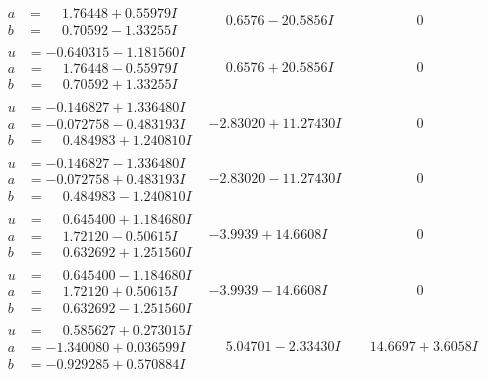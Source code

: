 \documentclass[1p]{elsarticle_modified}
\theoremstyle{definition}
\begin{document}
$$\begin{array}{c|c|c}
\begin{aligned}
a &= \phantom{-}1.76448 + 0.55979 I \\
b &= \phantom{-}0.70592 - 1.33255 I\end{aligned}
 & \phantom{-}0.6576 - 20.5856 I & \phantom{-0.000000 } 0 \\ \hline\begin{aligned}
u &= -0.640315 - 1.181560 I \\
a &= \phantom{-}1.76448 - 0.55979 I \\
b &= \phantom{-}0.70592 + 1.33255 I\end{aligned}
 & \phantom{-}0.6576 + 20.5856 I & \phantom{-0.000000 } 0 \\ \hline\begin{aligned}
u &= -0.146827 + 1.336480 I \\
a &= -0.072758 - 0.483193 I \\
b &= \phantom{-}0.484983 + 1.240810 I\end{aligned}
 & -2.83020 + 11.27430 I & \phantom{-0.000000 } 0 \\ \hline\begin{aligned}
u &= -0.146827 - 1.336480 I \\
a &= -0.072758 + 0.483193 I \\
b &= \phantom{-}0.484983 - 1.240810 I\end{aligned}
 & -2.83020 - 11.27430 I & \phantom{-0.000000 } 0 \\ \hline\begin{aligned}
u &= \phantom{-}0.645400 + 1.184680 I \\
a &= \phantom{-}1.72120 - 0.50615 I \\
b &= \phantom{-}0.632692 + 1.251560 I\end{aligned}
 & -3.9939 + 14.6608 I & \phantom{-0.000000 } 0 \\ \hline\begin{aligned}
u &= \phantom{-}0.645400 - 1.184680 I \\
a &= \phantom{-}1.72120 + 0.50615 I \\
b &= \phantom{-}0.632692 - 1.251560 I\end{aligned}
 & -3.9939 - 14.6608 I & \phantom{-0.000000 } 0 \\ \hline\begin{aligned}
u &= \phantom{-}0.585627 + 0.273015 I \\
a &= -1.340080 + 0.036599 I \\
b &= -0.929285 + 0.570884 I\end{aligned}
 & \phantom{-}5.04701 - 2.33430 I & \phantom{-}14.6697 + 3.6058 I \\ \hline\begin{aligned}

\end{aligned}
\end{array}$$
\end{document}
